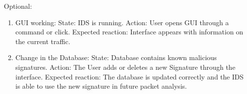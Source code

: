 \documentclass[oneside, english]{reports/assets/sdqtechreport}
\begin{document}
Optional:

\begin{enumerate}
	\item GUI working: State: IDS is running. Action: User opens GUI through a command or
	      click. Expected reaction: Interface appears with information on the current
	      traffic.
	\item Change in the Database: State: Database contains known malicious signatures.
	      Action: The User adds or deletes a new Signature through the interface.
	      Expected reaction: The database is updated correctly and the IDS is able to use
	      the new signature in future packet analysis.
\end{enumerate}
\end{document}
